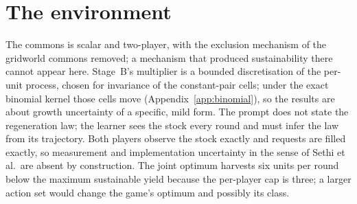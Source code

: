 \section{The environment}

The commons is scalar and two-player, with the exclusion mechanism of
the gridworld commons removed; a mechanism that produced sustainability
there cannot appear here.
Stage~B's multiplier is a bounded discretisation of the per-unit process,
chosen for invariance of the constant-pair cells; under the exact
binomial kernel those cells move (Appendix~\ref{app:binomial}), so the
results are about growth uncertainty of a specific, mild form.
The prompt does not state the regeneration law; the learner sees the
stock every round and must infer the law from its trajectory.
Both players observe the stock exactly and requests are filled exactly,
so measurement and implementation uncertainty in the sense of Sethi et
al.\ are absent by construction.
The joint optimum harvests six units per round below the maximum
sustainable yield because the per-player cap is three; a larger action
set would change the game's optimum and possibly its class.

